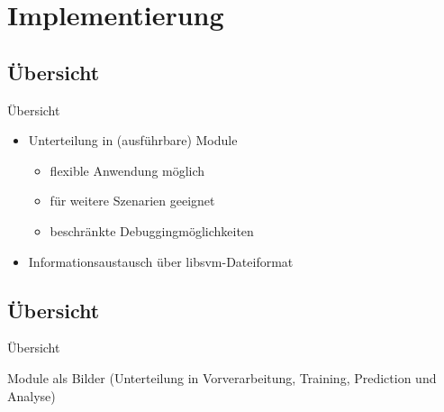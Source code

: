 \section{Implementierung}

\subsection{Übersicht}
\begin{frame}{Übersicht}
	\begin{itemize}[<+->]
		\item Unterteilung in (ausführbare) Module
		\begin{itemize}[<+->]
			\item[\textcolor{green}{\ding{223}}] flexible Anwendung möglich
			\item[\textcolor{green}{\ding{223}}] für weitere Szenarien geeignet
			\item[\textcolor{red}{\ding{223}}] beschränkte Debuggingmöglichkeiten
		\end{itemize}
		\item Informationsaustausch über libsvm-Dateiformat
	\end{itemize}
\end{frame}

\subsection{Übersicht}
\begin{frame}{Übersicht}
	\begin{center}
		Module als Bilder (Unterteilung in Vorverarbeitung, Training, Prediction und Analyse)
	\end{center}
\end{frame}
